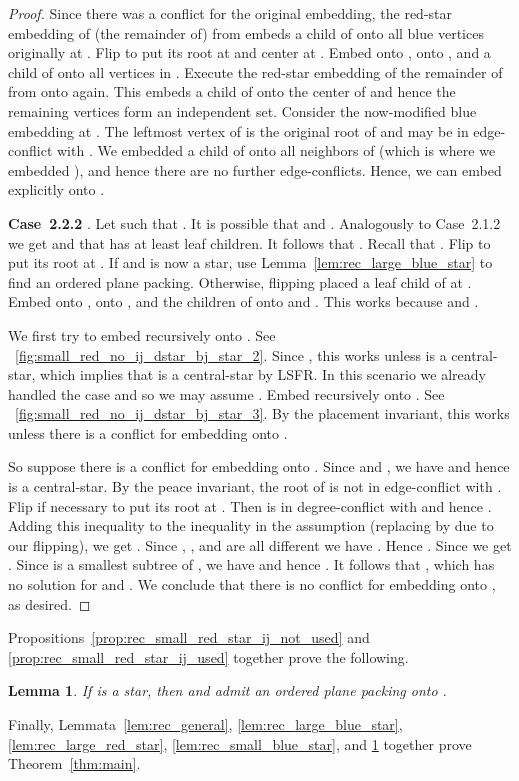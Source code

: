 \documentclass[11pt,a4paper,colorlinks=true,urlcolor=blue,citecolor=red]{article}
\theoremstyle{plain}
\newtheorem{lemma}[theorem]{Lemma}
\newcommand{\case}[1]{\par\vspace{.5\baselineskip}\noindent\textbf{\sffamily Case~#1}}
\begin{document}
\begin{proof}
  Since there was a conflict for the original embedding, the red-star
  embedding of (the remainder of)  from  embeds a child of 
  onto all blue vertices originally at . Flip  to put its
  root at  and center at . Embed  onto ,  onto , and
  a child of  onto all vertices in .  Execute the red-star
  embedding of the remainder of  from  onto 
  again. This embeds a child of  onto the center of  and
  hence the remaining vertices form an independent set. Consider the
  now-modified blue embedding at .  The leftmost vertex of
   is the original root of  and may be in
  edge-conflict with . We embedded a child of  onto all neighbors
  of  (which is where we embedded ), and hence there are no
  further edge-conflicts. Hence, we can embed  explicitly onto
  .

  \case{2.2.2} . Let  such that
  . It is possible that  and
  . Analogously to Case~2.1.2 we get
   and that  has at least  leaf
  children. It follows that . Recall that . Flip
   to put its root at . If  and  is now a
  star, use Lemma~\ref{lem:rec_large_blue_star} to find an ordered plane
  packing. Otherwise, flipping  placed a leaf child of  at
  . Embed  onto ,  onto , and the children of 
  onto  and . This works because  and .

  We first try to embed  recursively onto . See
  \figurename~\ref{fig:small_red_no_ij_dstar_bj_star_2}. Since ,
  this works unless  is a central-star, which
  implies that  is a central-star by LSFR. In this scenario we
  already handled the case  and so we may assume
  . Embed  recursively onto . See
  \figurename~\ref{fig:small_red_no_ij_dstar_bj_star_3}. By the
  placement invariant, this works unless there is a conflict for
  embedding  onto .

  So suppose there is a conflict for embedding  onto .
  Since  and , we have
   and hence  is a
  central-star. By the peace invariant, the root of  is not
  in edge-conflict with . Flip  if necessary to put its
  root at . Then  is in degree-conflict with  and hence
  . Adding this inequality to the
  inequality in the assumption (replacing  by  due to our
  flipping), we get
  . Since
  , , and  are all different we have
  . Hence
  . Since
   we get . Since  is
  a smallest subtree of , we have 
  and hence . It follows that
  , which has no solution for
   and . We conclude that there is no
  conflict for embedding  onto , as desired.
\end{proof}

\noindent
Propositions~\ref{prop:rec_small_red_star_ij_not_used} and
\ref{prop:rec_small_red_star_ij_used} together prove the following.
\begin{lemma}
  \label{lem:rec_small_red_star}
  If  is a star, then  and  admit an ordered plane packing
  onto .
\end{lemma}

\noindent
Finally, Lemmata~\ref{lem:rec_general}, \ref{lem:rec_large_blue_star},
\ref{lem:rec_large_red_star}, \ref{lem:rec_small_blue_star}, and
\ref{lem:rec_small_red_star} together prove
Theorem~\ref{thm:main}. \label{proofend}


\end{document}
